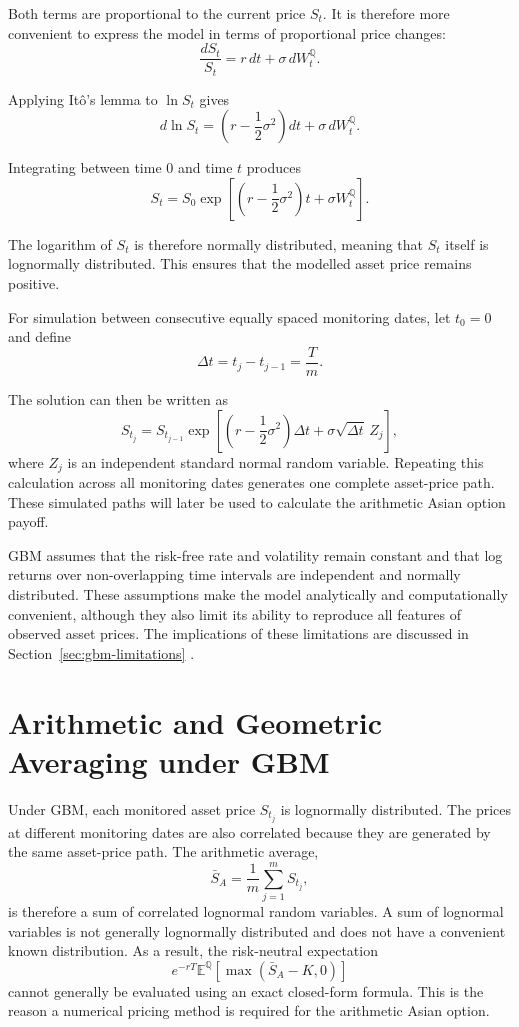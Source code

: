 Both terms are proportional to the current price \(S_t\). It is therefore more convenient to express the model in terms of proportional price changes:
\[
\frac{dS_t}{S_t}
=
r\,dt
+
\sigma\,dW_t^{\mathbb{Q}}.
\]

Applying Itô's lemma to \(\ln S_t\) gives
\[
d\ln S_t
=
\left(
r-\frac{1}{2}\sigma^2
\right)dt
+
\sigma\,dW_t^{\mathbb{Q}}.
\]

Integrating between time \(0\) and time \(t\) produces
\[
S_t
=
S_0
\exp\left[
\left(
r-\frac{1}{2}\sigma^2
\right)t
+
\sigma W_t^{\mathbb{Q}}
\right].
\]

The logarithm of \(S_t\) is therefore normally distributed, meaning that \(S_t\) itself is lognormally distributed. This ensures that the modelled asset price remains positive.

For simulation between consecutive equally spaced monitoring dates, let \(t_0=0\) and define
\[
\Delta t
=
t_j-t_{j-1}
=
\frac{T}{m}.
\]

The solution can then be written as
\[
S_{t_j}
=
S_{t_{j-1}}
\exp\left[
\left(
r-\frac{1}{2}\sigma^2
\right)\Delta t
+
\sigma\sqrt{\Delta t}\,Z_j
\right],
\]
where \(Z_j\) is an independent standard normal random variable. Repeating this calculation across all monitoring dates generates one complete asset-price path. These simulated paths will later be used to calculate the arithmetic Asian option payoff.

GBM assumes that the risk-free rate and volatility remain constant and that log returns over non-overlapping time intervals are independent and normally distributed. These assumptions make the model analytically and computationally convenient, although they also limit its ability to reproduce all features of observed asset prices. The implications of these limitations are discussed in Section~\ref{sec:gbm-limitations} \parencite{blackscholes1973,merton1973,glasserman2004}.

\section{Arithmetic and Geometric Averaging under GBM}
\label{sec:averaging-under-gbm}

Under GBM, each monitored asset price \(S_{t_j}\) is lognormally distributed. The prices at different monitoring dates are also correlated because they are generated by the same asset-price path. The arithmetic average,
\[
\bar{S}_A
=
\frac{1}{m}
\sum_{j=1}^{m}S_{t_j},
\]
is therefore a sum of correlated lognormal random variables. A sum of lognormal variables is not generally lognormally distributed and does not have a convenient known distribution. As a result, the risk-neutral expectation
\[
e^{-rT}
\mathbb{E}^{\mathbb{Q}}
\left[
\max\left(\bar{S}_A-K,0\right)
\right]
\]
cannot generally be evaluated using an exact closed-form formula. This is the reason a numerical pricing method is required for the arithmetic Asian option.

